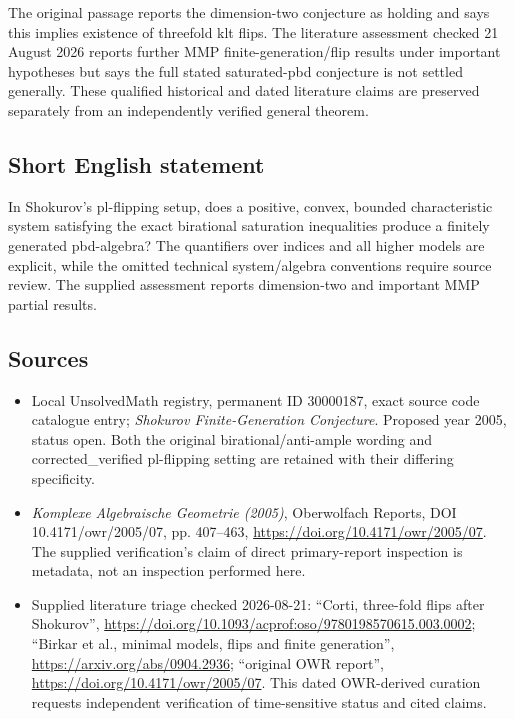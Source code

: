 \documentclass[11pt]{article}
\begin{document}
The original passage reports the dimension-two conjecture as holding and says this implies existence of threefold klt flips. The literature assessment checked 21 August 2026 reports further MMP finite-generation/flip results under important hypotheses but says the full stated saturated-pbd conjecture is not settled generally. These qualified historical and dated literature claims are preserved separately from an independently verified general theorem.
\subsection{Short English statement}
In Shokurov's pl-flipping setup, does a positive, convex, bounded characteristic system satisfying the exact birational saturation inequalities produce a finitely generated pbd-algebra? The quantifiers over indices and all higher models are explicit, while the omitted technical system/algebra conventions require source review. The supplied assessment reports dimension-two and important MMP partial results.
\subsection{Sources}
\begin{itemize}
\item Local UnsolvedMath registry, permanent ID 30000187, exact source code catalogue entry; \emph{Shokurov Finite-Generation Conjecture}. Proposed year 2005, status open. Both the original birational/anti-ample wording and corrected\_verified pl-flipping setting are retained with their differing specificity.
\item \emph{Komplexe Algebraische Geometrie (2005)}, Oberwolfach Reports, DOI 10.4171/owr/2005/07, pp. 407--463, \url{https://doi.org/10.4171/owr/2005/07}. The supplied verification's claim of direct primary-report inspection is metadata, not an inspection performed here.
\item Supplied literature triage checked 2026-08-21: ``Corti, three-fold flips after Shokurov'', \url{https://doi.org/10.1093/acprof:oso/9780198570615.003.0002}; ``Birkar et al., minimal models, flips and finite generation'', \url{https://arxiv.org/abs/0904.2936}; ``original OWR report'', \url{https://doi.org/10.4171/owr/2005/07}. This dated OWR-derived curation requests independent verification of time-sensitive status and cited claims.
\end{itemize}
\end{document}
